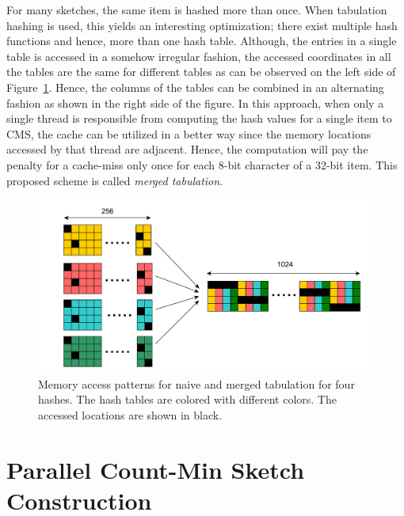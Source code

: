 \documentclass[runningheads]{llncs}
\begin{document}
For many sketches, the same item is hashed more than once. When tabulation hashing is used, this yields an interesting optimization; there exist multiple hash functions and hence, more than one hash table. Although, the entries in a single table is accessed in a somehow irregular fashion, the accessed coordinates in all the tables are the same for different tables as can be observed on the left side of Figure~\ref{fig:merged_tabular_access}. Hence, the columns of the tables can be combined in an alternating fashion as shown in the right side of the figure. In this approach, when only a single thread is responsible from computing the hash values for a single item to CMS, the cache can be utilized in a better way since the memory locations accessed by that thread are adjacent. Hence, the computation will pay the penalty for a cache-miss only once for each 8-bit character of a 32-bit item. This proposed scheme is called {\em merged tabulation}.

 \begin{figure}[htbp]
\begin{minipage}[c]{0.65\textwidth}
\includegraphics[width=\textwidth]{merged_tabular_access.pdf}
  \end{minipage}\hfill\hfill\hfill
 \begin{minipage}[c]{0.28\textwidth}
\caption{\small{Memory access patterns for naive and merged tabulation for four hashes. The hash tables are colored with different colors. The accessed locations are shown in black.}}
\label{fig:merged_tabular_access}
  \end{minipage}
\end{figure}

\section{Parallel Count-Min Sketch Construction}\label{sec:par}
\end{document}
